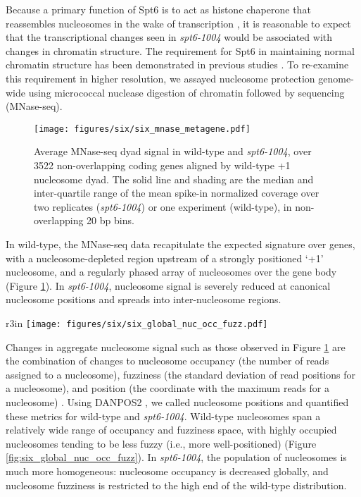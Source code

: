 Because a primary function of Spt6 is to act as histone chaperone that reassembles nucleosomes in the wake of transcription \citep{duina2011}, it is reasonable to expect that the transcriptional changes seen in \textit{spt6-1004} would be associated with changes in chromatin structure.
The requirement for Spt6 in maintaining normal chromatin structure has been demonstrated in previous studies \citep{bortvin1996, ivanovska2011, jeronimo2015, kaplan2003, perales2013, vanbakel2013, degennaro2013}.
To re-examine this requirement in higher resolution, we assayed nucleosome protection genome-wide using micrococcal nuclease digestion of chromatin followed by sequencing (MNase-seq).
\begin{figure}[h]
    \centering
    \texttt{[image: figures/six/six\_mnase\_metagene.pdf]}
    \caption[Average MNase-seq dyad signal in wild-type and \textit{spt6-1004}, over non-overlapping genes aligned by wild-type +1 nucleosome dyad.]{Average MNase-seq dyad signal in wild-type and \textit{spt6-1004}, over 3522 non-overlapping coding genes aligned by wild-type +1 nucleosome dyad. The solid line and shading are the median and inter-quartile range of the mean spike-in normalized coverage over two replicates (\textit{spt6-1004}) or one experiment (wild-type), in non-overlapping 20 bp bins.}
    \label{fig:six_mnase_metagene}
\end{figure}

In wild-type, the MNase-seq data recapitulate the expected signature over genes, with a nucleosome-depleted region upstream of a strongly positioned `+1' nucleosome, and a regularly phased array of nucleosomes over the gene body (Figure \ref{fig:six_mnase_metagene}).
In \textit{spt6-1004}, nucleosome signal is severely reduced at canonical nucleosome positions and spreads into inter-nucleosome regions.

\begin{wrapfigure}[10]{r}{3in}
    \centering
    \texttt{[image: figures/six/six\_global\_nuc\_occ\_fuzz.pdf]}
    \caption[Contour plot of nucleosome occupancy and fuzziness in wild-type and \textit{spt6-1004}.]{Contour plot of the distributions of nucleosome occupancy and fuzziness in wild-type and \textit{spt6-1004}. Dashed lines indicate median values.}
    \label{fig:six_global_nuc_occ_fuzz}
\end{wrapfigure}
Changes in aggregate nucleosome signal such as those observed in Figure \ref{fig:six_mnase_metagene} are the combination of changes to nucleosome occupancy (the number of reads assigned to a nucleosome), fuzziness (the standard deviation of read positions for a nucleosome), and position (the coordinate with the maximum reads for a nucleosome) \citep{chen2013}.
Using DANPOS2 \citep{chen2013}, we called nucleosome positions and quantified these metrics for wild-type and \textit{spt6-1004}.
Wild-type nucleosomes span a relatively wide range of occupancy and fuzziness space, with highly occupied nucleosomes tending to be less fuzzy (i.e., more well-positioned) (Figure \ref{fig:six_global_nuc_occ_fuzz}).
In \textit{spt6-1004}, the population of nucleosomes is much more homogeneous: nucleosome occupancy is decreased globally, and nucleosome fuzziness is restricted to the high end of the wild-type distribution.

